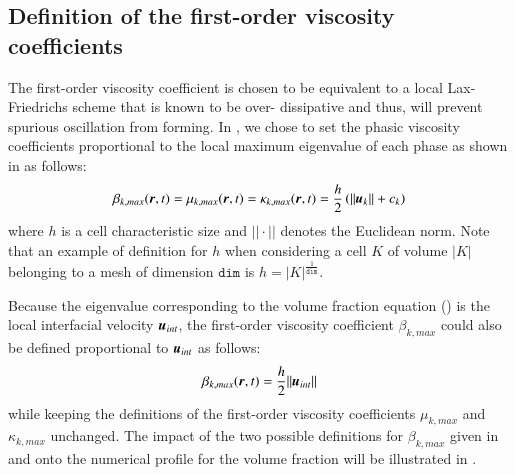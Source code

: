 \documentclass[preprint,10pt]{elsarticle}
\begin{document}
\subsection{Definition of the first-order viscosity coefficients}\label{sec:visc-coeff-fo}
%
The first-order viscosity coefficient is chosen to be equivalent to a local Lax-Friedrichs scheme that is known to be over-
dissipative and thus, will prevent spurious oscillation from forming. In \cite{Marco_paper_sem}, we chose to set the phasic viscosity 
coefficients proportional to the local maximum eigenvalue of each phase as shown in  as follows:
%
\begin{equation}\label{eq:visc-coeff-fo-def-1}
\beta_{k,max}(\boldsymbol r,t) = \mu_{k,max}(\boldsymbol r,t) = \kappa_{k,max}(\boldsymbol r,t) = \frac{h}{2} \left( || \boldsymbol u_k || + c_k \right)
\end{equation}
%
where $h$ is a cell characteristic size and $|| \cdot ||$ denotes the Euclidean norm. Note that an example of definition for $h$ when considering a 
cell $K$ of volume $|K|$ belonging to a mesh of dimension 
$\texttt{dim}$ is $h = |K|^\frac{1}{\texttt{dim}}$. 
%
\begin{remark}
Because the eigenvalue corresponding to the volume fraction equation () is the local interfacial velocity $\boldsymbol u_{int}$,
the first-order viscosity coefficient $\beta_{k,max}$ could also be defined proportional to $\boldsymbol u_{int}$ as follows:
%
\begin{equation}\label{eq:visc-coeff-fo-def-2}
\beta_{k,max}(\boldsymbol r,t) = \frac{h}{2} || \boldsymbol u_{int} ||
\end{equation}
%
while keeping the definitions of the first-order viscosity coefficients $\mu_{k,max}$ and $\kappa_{k,max}$ unchanged.
The impact of the two possible definitions for $\beta_{k,max}$ given in  and  onto the numerical 
profile for the volume fraction will be illustrated in .
\end{remark}
%
\end{document}
